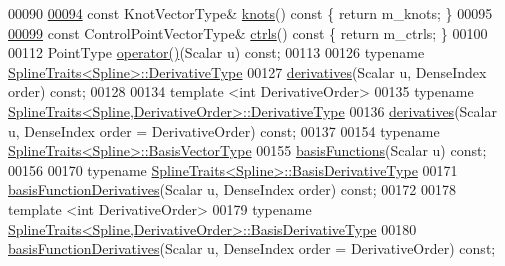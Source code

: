 \begin{DoxyCode}
00090 
\hyperlink{group___splines___module_ae3eac8af580ad880d8ad3a259d453aa1}{00094}     \textcolor{keyword}{const} KnotVectorType& \hyperlink{group___splines___module_ae3eac8af580ad880d8ad3a259d453aa1}{knots}()\textcolor{keyword}{ const }\{ \textcolor{keywordflow}{return} m\_knots; \}
00095     
\hyperlink{group___splines___module_a0fc81e475d3a0ba34da1bd97f2e8fbc7}{00099}     \textcolor{keyword}{const} ControlPointVectorType& \hyperlink{group___splines___module_a0fc81e475d3a0ba34da1bd97f2e8fbc7}{ctrls}()\textcolor{keyword}{ const }\{ \textcolor{keywordflow}{return} m\_ctrls; \}
00100 
00112     PointType \hyperlink{group___splines___module_a3c7e1838eae4ee7e341ef9d3dbf9ba45}{operator()}(Scalar u) \textcolor{keyword}{const};
00113 
00126     \textcolor{keyword}{typename} \hyperlink{struct_eigen_1_1_spline_traits}{SplineTraits<Spline>::DerivativeType}
00127       \hyperlink{group___splines___module_a196730cf190dfa16907db888277e5aed}{derivatives}(Scalar u, DenseIndex order) \textcolor{keyword}{const};
00128 
00134     \textcolor{keyword}{template} <\textcolor{keywordtype}{int} DerivativeOrder>
00135     \textcolor{keyword}{typename} \hyperlink{struct_eigen_1_1_spline_traits}{SplineTraits<Spline,DerivativeOrder>::DerivativeType}
00136       \hyperlink{group___splines___module_a196730cf190dfa16907db888277e5aed}{derivatives}(Scalar u, DenseIndex order = DerivativeOrder) \textcolor{keyword}{const};
00137 
00154     \textcolor{keyword}{typename} \hyperlink{struct_eigen_1_1_spline_traits}{SplineTraits<Spline>::BasisVectorType}
00155       \hyperlink{group___splines___module_afe0997f0bb02a3fac3073016abac04c6}{basisFunctions}(Scalar u) \textcolor{keyword}{const};
00156 
00170     \textcolor{keyword}{typename} \hyperlink{struct_eigen_1_1_spline_traits}{SplineTraits<Spline>::BasisDerivativeType}
00171       \hyperlink{group___splines___module_a17d416e814d1ee957e5b309dc423751f}{basisFunctionDerivatives}(Scalar u, DenseIndex order) \textcolor{keyword}{const};
00172 
00178     \textcolor{keyword}{template} <\textcolor{keywordtype}{int} DerivativeOrder>
00179     \textcolor{keyword}{typename} \hyperlink{struct_eigen_1_1_spline_traits}{SplineTraits<Spline,DerivativeOrder>::BasisDerivativeType}
00180       \hyperlink{group___splines___module_a17d416e814d1ee957e5b309dc423751f}{basisFunctionDerivatives}(Scalar u, DenseIndex order = DerivativeOrder) \textcolor{keyword}{const};

\end{DoxyCode}

